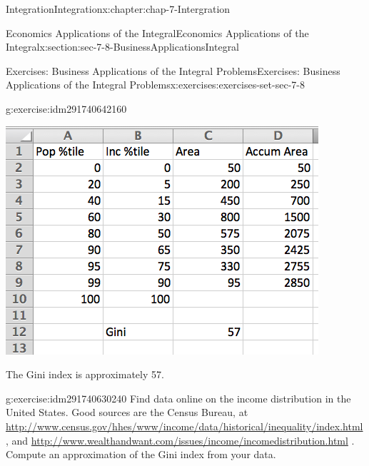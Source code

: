 \documentclass[oneside,10pt,]{book}
\numberwithin{equation}{section}
\begin{document}
\begin{chapterptx}{Integration}{}{Integration}{}{}{x:chapter:chap-7-Intergration}
\begin{sectionptx}{Economics Applications of the Integral}{}{Economics Applications of the Integral}{}{}{x:section:sec-7-8-BusinessApplicationsIntegral}
\begin{exercises-subsection}{Exercises: Business Applications of the Integral Problems}{}{Exercises: Business Applications of the Integral Problems}{}{}{x:exercises:exercises-set-sec-7-8}
\begin{divisionexercise}{13}{}{}{g:exercise:idm291740642160}
\begin{sidebyside}{1}{0.2}{0.2}{0}
\begin{sbspanel}{0.6}
\includegraphics[width=\linewidth]{images/sec7-8-sol13a.png}
\end{sbspanel}%
\end{sidebyside}%
\par
The Gini index is approximately 57.%
\end{divisionexercise}%
\begin{divisionexercise}{14}{}{}{g:exercise:idm291740630240}%
Find data online on the income distribution in the United States.  Good sources are the Census Bureau, at \href{http://www.census.gov/hhes/www/income/data/historical/inequality/index.html}{http:\slash{}\slash{}www.census.gov\slash{}hhes\slash{}www\slash{}income\slash{}data\slash{}historical\slash{}inequality\slash{}index.html}, and \href{http://www.wealthandwant.com/issues/income/income_distribution.html}{http:\slash{}\slash{}www.wealthandwant.com\slash{}issues\slash{}income\slash{}income\textunderscore{}distribution.html} . Compute an approximation of the Gini index from your data.%
\end{divisionexercise}%
\end{exercises-subsection}
\end{sectionptx}
\end{chapterptx}
\end{document}
